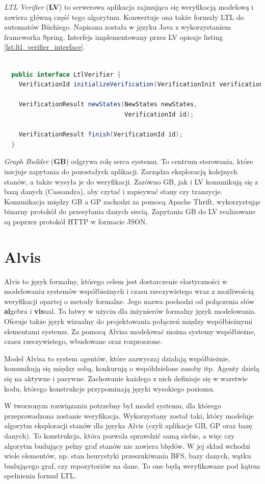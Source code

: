 \textit{LTL Verifier} (\textbf{LV}) to serwerowa aplikacja zajmująca się weryfikacją modelową i zawiera główną część tego algorytmu.
Konwertuje ona także formuły LTL do automatów Büchiego.
Napisana została w języku Java z wykorzystaniem frameworka Spring.
Interfejs implementowany przez LV opisuje listing \ref{lst:ltl_verifier_interface}.

\begin{lstlisting}[caption={Interfejs implementowany przez LV.},captionpos=b,label={lst:ltl_verifier_interface},language=Java]

  public interface LtlVerifier {
    VerificationId initializeVerification(VerificationInit verificationInit);

    VerificationResult newStates(NewStates newStates,
                                 VerificationId id);

    VerificationResult finish(VerificationId id);
  }
\end{lstlisting}

\textit{Graph Builder} (\textbf{GB}) odgrywa rolę serca systemu.
To centrum sterowania, które inicjuje zapytania do pozostałych aplikacji.
Zarządza eksploracją kolejnych stanów, a także wysyła je do weryfikacji.
Zarówno GB, jak i LV komunikują się z bazą danych (Cassandra), aby czytać i zapisywać stany czy tranzycje.
Komunikacja między GB a GP zachodzi za pomocą Apache Thrift, wykorzystując binarny protokół do  przesyłania danych siecią.
Zapytania GB do LV realizowane są poprzez protokół HTTP w formacie JSON.


\section{Alvis}

Alvis to język formalny, którego celem jest dostarczenie elastyczności w modelowaniu systemów współbieżnych i czasu rzeczywistego wraz z możliwością weryfikacji opartej o metody formalne.
Jego nazwa pochodzi od połączenia słów \textbf{al}gebra i \textbf{vis}ual.
To łatwy w użyciu dla inżynierów formalny język modelowania.
Oferuje także język wizualny do projektowania połączeń między współbieżnymi elementami systemu.
Za pomocą Alvisa modelować można systemy współbieżne, czasu rzeczywistego, wbudowane oraz rozproszone.

Model Alvisa to system agentów, które zazwyczaj działają współbieżnie, komunikują się między sobą, konkurują o współdzielone zasoby itp.
Agenty dzielą się na aktywne i pasywne.
Zachowanie każdego z nich definiuje się w warstwie kodu, którego konstrukcje przypominają języki wysokiego poziomu.

W tworzonym rozwiązaniu potrzebny był model systemu, dla którego przeprowadzona zostanie weryfikacja.
Wykorzystany został taki, który modeluje algorytm eksploracji stanów dla języka Alvis (czyli aplikacje GB, GP oraz bazę danych).
To konstrukcja, która pozwala sprawdzić samą siebie, a więc czy algorytm budujący pełny graf stanów nie zawiera błędów.
W jej skład wchodzi wiele elementów, np. stan heurystyki przeszukiwania BFS, bazy danych, wątku budującego graf, czy repozytoriów na dane.
To one będą weryfikowane pod kątem spełnienia formuł LTL.
